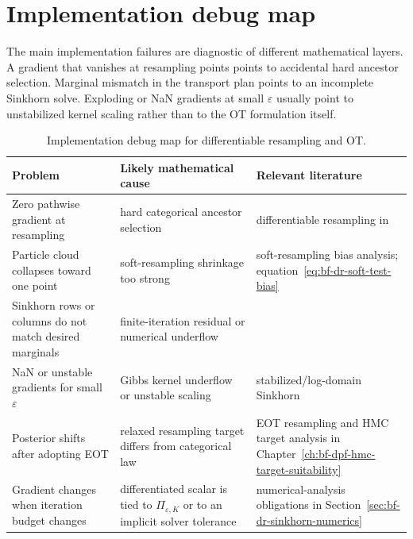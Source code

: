 \section{Implementation debug map}
\label{sec:bf-dr-debug-map}

The main implementation failures are diagnostic of different mathematical
layers.  A gradient that vanishes at resampling points points to accidental hard
ancestor selection.  Marginal mismatch in the transport plan points to an
incomplete Sinkhorn solve.  Exploding or NaN gradients at small $\varepsilon$
usually point to unstabilized kernel scaling rather than to the OT formulation
itself.

\begin{table}[ht]
\centering
\small
\begin{tabular}{p{} p{} p{}}
\toprule
Problem & Likely mathematical cause & Relevant literature \\
\midrule
Zero pathwise gradient at resampling & hard categorical ancestor selection & differentiable resampling in \citet{zhumurphyjonschkowski2020} \\
Particle cloud collapses toward one point & soft-resampling shrinkage too strong & soft-resampling bias analysis; equation~\eqref{eq:bf-dr-soft-test-bias} \\
Sinkhorn rows or columns do not match desired marginals & finite-iteration residual or numerical underflow & \citet{cuturi2013sinkhorn,peyre2019computational} \\
NaN or unstable gradients for small $\varepsilon$ & Gibbs kernel underflow or unstable scaling & stabilized/log-domain Sinkhorn \citep{schmitzer2019stabilized} \\
Posterior shifts after adopting EOT & relaxed resampling target differs from categorical law & EOT resampling \citep{corenflos2021differentiable} and HMC target analysis in Chapter~\ref{ch:bf-dpf-hmc-target-suitability} \\
Gradient changes when iteration budget changes & differentiated scalar is tied to $\Pi_{\varepsilon,K}$ or to an implicit solver tolerance & numerical-analysis obligations in Section~\ref{sec:bf-dr-sinkhorn-numerics} \\
\bottomrule
\end{tabular}
\caption{Implementation debug map for differentiable resampling and OT.}
\label{tab:bf-dr-debug-map}
\end{table}


